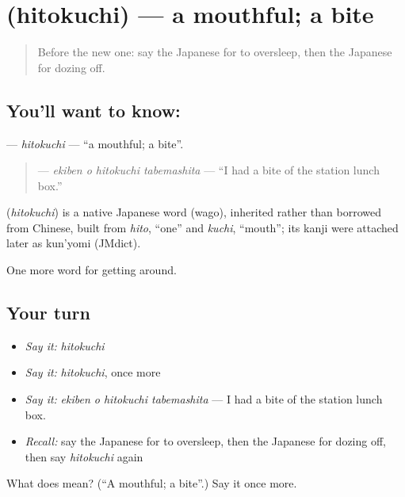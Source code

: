 \section[\texorpdfstring{\ja{ひとくち} (hitokuchi)}{ひとくち (hitokuchi)}]{ (hitokuchi) — a mouthful; a bite}

\label{lesson:JA-C380-hitokuchi}



\begin{quote}
Before the new one: say the Japanese for to oversleep, then the Japanese for dozing off.
\end{quote}

\subsection*{You'll want to know: }
\textbf{} — \emph{hitokuchi} — \textquotedblleft{}a mouthful; a bite\textquotedblright{}.

\begin{quote}
\textbf{  } — \emph{ekiben o hitokuchi tabemashita} — \textquotedblleft{}I had a bite of the station lunch box.\textquotedblright{}
\end{quote}

\begin{cousinweb}
\textbf{} (\emph{hitokuchi}) is a native Japanese word (wago), inherited rather than borrowed from Chinese, built from \emph{hito}, \textquotedblleft{}one\textquotedblright{} and \emph{kuchi}, \textquotedblleft{}mouth\textquotedblright{}; its kanji were attached later as kun'yomi (JMdict).
\end{cousinweb}

\begin{grammarlens}[title={What you've built}]
One more word for getting around.
\end{grammarlens}

\subsection*{Your turn}
\begin{itemize}
\raggedright
  \item \emph{Say it:} \emph{hitokuchi}
  \item \emph{Say it:} \emph{hitokuchi}, once more
  \item \emph{Say it:} \emph{ekiben o hitokuchi tabemashita} — I had a bite of the station lunch box.
  \item \emph{Recall:} say the Japanese for to oversleep, then the Japanese for dozing off, then say \emph{hitokuchi} again
\end{itemize}

\begin{tcolorbox}[breakable,colback=teal!4,colframe=teal!35!black,title={Before you move on}]
What does  mean? (\textquotedblleft{}A mouthful; a bite\textquotedblright{}.) Say it once more.
\end{tcolorbox}
